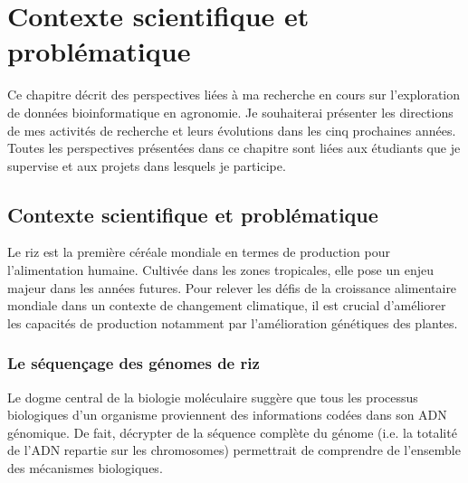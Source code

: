 \chapter{Contexte scientifique et problématique} %

\label{Perspectives} %

Ce chapitre décrit des perspectives liées à ma recherche en cours sur l'exploration de données bioinformatique en agronomie.
Je souhaiterai présenter les directions de mes activités de recherche et leurs évolutions dans les cinq prochaines années. Toutes les perspectives présentées dans ce chapitre sont liées aux étudiants que je supervise et aux projets dans lesquels je participe.



\section{Contexte scientifique et problématique}

Le riz est la première céréale mondiale en termes de production pour l'alimentation humaine. Cultivée dans les zones tropicales, elle pose un enjeu majeur dans les années futures. Pour relever les défis de la croissance alimentaire mondiale dans un contexte de changement climatique, il est crucial d'améliorer les capacités de production notamment par l’amélioration génétiques des plantes. \\

\subsection{Le séquençage des génomes de riz}
Le dogme central de la biologie moléculaire\label{dogma} suggère que tous les processus biologiques d'un organisme proviennent des informations codées dans son ADN génomique. De fait, décrypter de la séquence complète du génome (i.e. la totalité de l'ADN repartie sur les chromosomes) permettrait de comprendre de l'ensemble des mécanismes biologiques.\\

